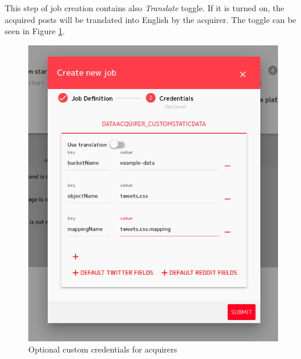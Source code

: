 \documentclass{article}
\begin{document}
This step of job creation contains also \textit{Translate} toggle. If it is turned on, the acquired posts will be translated into English by the acquirer. The toggle can be seen in Figure \ref{figure:create-job-dialogue-credential}.

\begin{figure}[h]
\includegraphics[scale=2]{images/create_job_credentials.png}
\centering
\caption{Optional custom credentials for acquirers}
\label{figure:create-job-dialogue-credential}
\end{figure}
\end{document}
